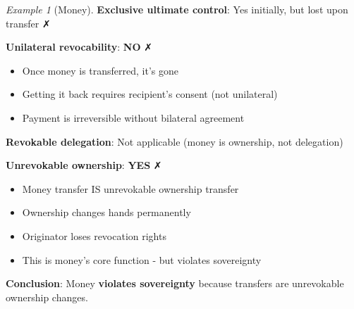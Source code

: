 \documentclass[11pt,a4paper]{article}
\theoremstyle{definition}
\theoremstyle{remark}
\newtheorem{example}[theorem]{Example}
\begin{document}
\begin{example}[Money]
\textbf{Exclusive ultimate control}: Yes initially, but lost upon transfer ✗

\textbf{Unilateral revocability}: \textbf{NO} ✗
\begin{itemize}
\item Once money is transferred, it's gone
\item Getting it back requires recipient's consent (not unilateral)
\item Payment is irreversible without bilateral agreement
\end{itemize}

\textbf{Revokable delegation}: Not applicable (money is ownership, not delegation)

\textbf{Unrevokable ownership}: \textbf{YES} ✗
\begin{itemize}
\item Money transfer IS unrevokable ownership transfer
\item Ownership changes hands permanently
\item Originator loses revocation rights
\item This is money's core function - but violates sovereignty
\end{itemize}

\textbf{Conclusion}: Money \textbf{violates sovereignty} because transfers are unrevokable ownership changes.
\end{example}
\end{document}
